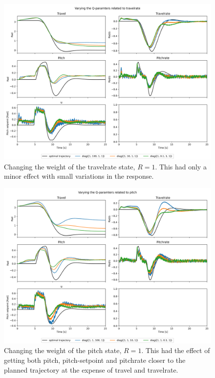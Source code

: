 \documentclass[../main.tex]{subfiles}
\begin{document}
\begin{figure}[h]
	\centering
	\includegraphics[width=0.8\linewidth]{figures/LAB3_Q_variations_travelrate.png}
	\caption{Changing the weight of the travelrate state, $R=1$. This had only a minor effect with small variations in the response.}
	\label{fig:LAB3_Q_variations_travelrate}
\end{figure}

\begin{figure}[h]
	\centering
	\includegraphics[width=0.8\linewidth]{figures/LAB3_Q_variations_pitch.png}
	\caption{Changing the weight of the pitch state, $R=1$. This had the effect of getting both pitch, pitch-setpoint and pitchrate closer to the planned trajectory at the expense of travel and travelrate.}
	\label{fig:LAB3_Q_variations_pitch}
\end{figure}
\end{document}
